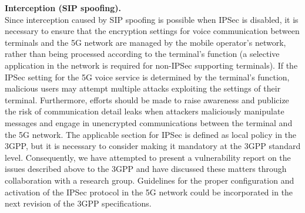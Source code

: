 \documentclass[english]{article}
\begin{document}
\textbf{Interception (SIP spoofing).}\\
Since interception caused by SIP spoofing is possible when IPSec is disabled,
it is necessary to ensure that the encryption settings for voice communication
between terminals and the 5G network are managed by the mobile operator's network,
rather than being processed according to the terminal's function (a selective
application in the network is required for non-IPSec supporting terminals). If
the IPSec setting for the 5G voice service is determined by the terminal's function,
malicious users may attempt multiple attacks exploiting the settings of their terminal.
Furthermore, efforts should be made to raise awareness and publicize the risk of
communication detail leaks when attackers maliciously manipulate messages and engage
in unencrypted communications between the terminal and the 5G network. The applicable
section for IPSec is defined as local policy in the 3GPP, but it is necessary to
consider making it mandatory at the 3GPP standard level. Consequently, we have
attempted to present a vulnerability report on the issues described above to the
3GPP and have discussed these matters through collaboration with a research group.
Guidelines for the proper configuration and activation of the IPSec protocol in the
5G network could be incorporated in the next revision of the 3GPP specifications.
\end{document}
